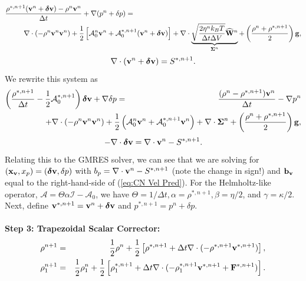 \documentclass[final]{siamltex}
\def\bb {{\bf b}}
\def\Fb {{\bf F}}
\def\gb {{\bf g}}
\def\vb {{\bf v}}
\def\Wb {{\bf W}}
\def\xb {{\bf x}}
\def\deltab {\boldsymbol{\delta}}
\def\Sigmab {\boldsymbol{\Sigma}}
\def\half   {\frac{1}{2}}
\begin{document}
\begin{eqnarray}
\frac{\rho^{*,n+1}(\vb^n + \deltab\vb) - \rho^n\vb^n}{\Delta t} + \nabla(p^n+\delta p) &=&\nonumber\\
&&\hspace{-2.25in}\nabla\cdot(-\rho^n\vb^n\vb^n) + \half\left[\mathcal{A}_0^n\vb^n + \mathcal{A}_0^{*,n+1}(\vb^n + \deltab\vb)\right] + \nabla\cdot\underbrace{\sqrt{\frac{2\eta^n k_B T}{\Delta t\Delta V}}\widehat\Wb^n}_{\Sigmab^n} + \left(\frac{\rho^n+\rho^{*,n+1}}{2}\right)\gb,\nonumber\\
\end{eqnarray}
\begin{equation}
\nabla\cdot(\vb^n+\deltab\vb) = S^{*,n+1}.
\end{equation}
We rewrite this system as
\begin{eqnarray}
\left(\frac{\rho^{*,n+1}}{\Delta t} - \half\mathcal{A}_0^{*,n+1}\right)\deltab\vb + \nabla\delta p &=& \frac{(\rho^n-\rho^{*,n+1})\vb^n}{\Delta t} -\nabla p^n\nonumber\\
&&\hspace{-1.5in}+ \nabla\cdot(-\rho^n\vb^n\vb^n) + \half\left(\mathcal{A}_0^n\vb^n + \mathcal{A}_0^{*,n+1}\vb^n\right) + \nabla\cdot\Sigmab^n + \left(\frac{\rho^n+\rho^{*,n+1}}{2}\right)\gb,\label{eq:CN Vel Pred}
\end{eqnarray}
\begin{equation}
-\nabla\cdot\deltab\vb = \nabla\cdot\vb^n - S^{*,n+1}.
\end{equation}
Relating this to the GMRES solver, we can see that we are solving for 
$(\xb_\vb,x_p) = (\deltab\vb,\delta p)$ with $b_p = \nabla\cdot\vb^n-S^{*,n+1}$ (note the change in sign!) 
and $\bb_\vb$ equal to the right-hand-side of (\ref{eq:CN Vel Pred}).  For the Helmholtz-like operator, 
$\mathcal{A}=\Theta\alpha\mathcal{I} - \mathcal{A}_0$, we have $\Theta=1/\Delta t, \alpha=\rho^{*,n+1}, 
\beta=\eta/2$, and $\gamma=\kappa/2$.
Next, define $\vb^{*,n+1} = \vb^n + \deltab\vb$ and $p^{*,n+1} = p^n + \delta p$.\\ \\
{\bf Step 3: Trapezoidal Scalar Corrector:}
\begin{eqnarray}
\rho^{n+1} &=& \half\rho^n + \half\left[\rho^{*,n+1} + \Delta t\nabla\cdot(-\rho^{*,n+1}\vb^{*,n+1})\right],\label{eq:alg1_2nd_rho_adv}\\
\rho_1^{n+1} &=& \half\rho_1^n + \half\left[\rho_1^{*,n+1} + \Delta t\nabla\cdot(-\rho_1^{*,n+1}\vb^{*,n+1} + \Fb^{*,n+1})\right].\label{eq:alg1_2nd_rho1_adv}
\end{eqnarray}
\end{document}
